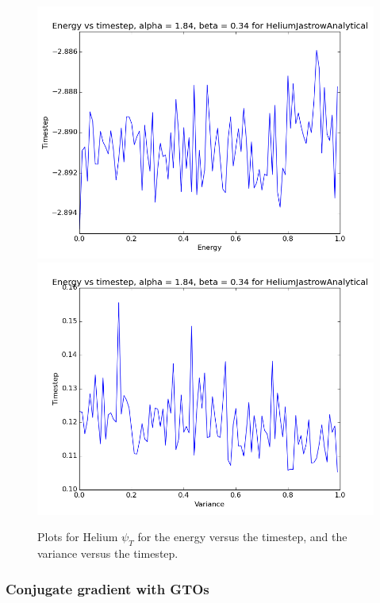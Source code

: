 			\begin{figure}
				\centering \includegraphics[width=0.45\linewidth]{../figures/HeliumJastrowAnalyticalTimeEnergy}
				\includegraphics[width=0.45\linewidth]{../figures/HeliumJastrowAnalyticalTimeVariance}
				\protect\caption{Plots for Helium $\psi_{T}$ for the energy versus the timestep, and the variance versus the timestep.}
				\label{fig:HeliumTimestep}
			\end{figure}


		\subsubsection{Conjugate gradient with GTOs}